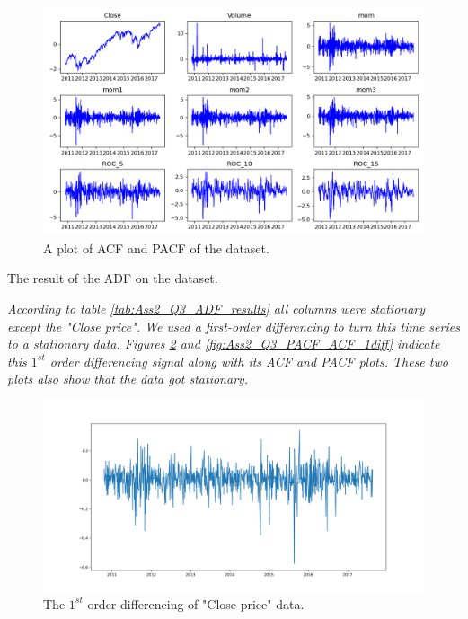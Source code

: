 \begin{figure}[H]
    \centering
    \begin{minipage}[b]{1\textwidth}
        \includegraphics[width=\textwidth]{figures/Ass2/Ass2_Q3_standard_data.png}
    \end{minipage}
    \caption{A plot of \gls{ACF} and \gls{PACF} of the dataset.}
    \label{fig:Ass2_Q3_standard_data}
\end{figure}


\begin{table}[H]
\centering
\caption{The result of the \gls{ADF} on the dataset.}
\label{tab:Ass2_Q3_ADF_results}

\end{table}

\textit{According to table \ref{tab:Ass2_Q3_ADF_results} all columns were stationary except the "Close price".  
We used a first-order differencing to turn this time series to a stationary data. Figures \ref{fig:Ass2_Q3_1diff_Close_signal} and \ref{fig:Ass2_Q3_PACF_ACF_1diff} indicate this $1^{st}$ order differencing signal along with its \gls{ACF} and \gls{PACF} plots. These two plots also show that the data got stationary.}

\begin{figure}[H]
    \centering
    \begin{minipage}[b]{1\textwidth}
        \includegraphics[width=\textwidth]{figures/Ass2/Ass2_Q3_1diff_Close_signal.png}
    \end{minipage}
    \caption{The $1^{st}$ order differencing of "Close price" data.}
    \label{fig:Ass2_Q3_1diff_Close_signal}
\end{figure}


